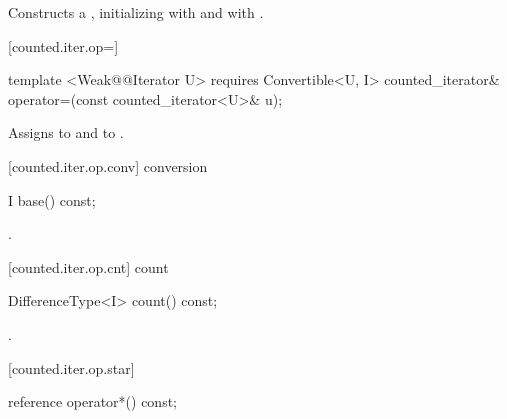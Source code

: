 \begin{addedblock}
\begin{itemdescr}
\pnum
\effects Constructs a , initializing
 with  and  with .
\end{itemdescr}

[counted.iter.op=]{}

%
%
\begin{itemdecl}
template <Weak@@Iterator U>
  requires Convertible<U, I>
counted_iterator& operator=(const counted_iterator<U>& u);
\end{itemdecl}

\begin{itemdescr}
\pnum
\effects Assigns  to
 and  to .

\end{itemdescr}

[counted.iter.op.conv]{ conversion}

%
%
\begin{itemdecl}
I base() const;
\end{itemdecl}

\begin{itemdescr}
\pnum
\returns {}.
\end{itemdescr}

[counted.iter.op.cnt]{ count}

%
%
\begin{itemdecl}
DifferenceType<I> count() const;
\end{itemdecl}

\begin{itemdescr}
\pnum
\returns {}.
\end{itemdescr}

[counted.iter.op.star]{}

%
%
\begin{itemdecl}
reference operator*() const;
\end{itemdecl}


\end{addedblock}
